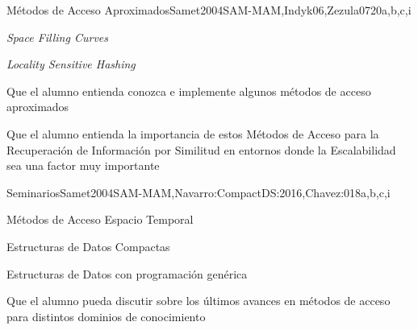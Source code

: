 \begin{syllabus}
\begin{unit}{Métodos de Acceso Aproximados}{Samet2004SAM-MAM,Indyk06,Zezula07}{20}{a,b,c,i}
   \begin{topics}
         \item {\it Space Filling Curves}
         \item {\it Locality Sensitive Hashing}
   \end{topics}

   \begin{learningoutcomes}
         \item Que el alumno entienda conozca e implemente algunos métodos de acceso aproximados
         \item Que el alumno entienda la importancia de estos Métodos de Acceso para la Recuperación de Información por Similitud en entornos donde la Escalabilidad sea una factor muy importante
   \end{learningoutcomes}
\end{unit}

\begin{unit}{Seminarios}{Samet2004SAM-MAM,Navarro:CompactDS:2016,Chavez:01}{8}{a,b,c,i}
	\begin{topics}
         \item Métodos de Acceso Espacio Temporal
         \item Estructuras de Datos Compactas
         \item Estructuras de Datos con programación genérica
   \end{topics}

   \begin{learningoutcomes}
         \item Que el alumno pueda discutir sobre los últimos avances en métodos de acceso para distintos dominios de conocimiento
   \end{learningoutcomes}
\end{unit}



\begin{coursebibliography}
\end{coursebibliography}

\end{syllabus}
